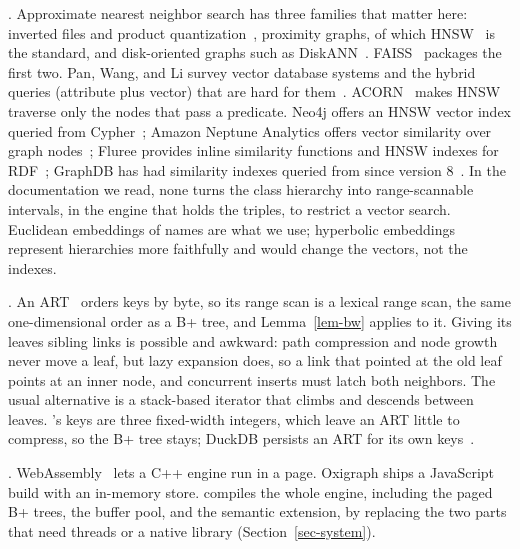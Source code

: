 .
Approximate nearest neighbor search has three families that matter here:
inverted files and product quantization~\cite{jegou2011}, proximity graphs, of
which HNSW~\cite{malkov2020} is the standard, and disk-oriented graphs such as
DiskANN~\cite{subramanya2019}.
FAISS~\cite{johnson2021} packages the first two.
Pan, Wang, and Li survey vector database systems and the hybrid queries
(attribute plus vector) that are hard for them~\cite{pan2024}.
ACORN~\cite{patel2024} makes HNSW traverse only the nodes that pass a
predicate.
Neo4j offers an HNSW vector index queried from Cypher~\cite{neo4jvec}; Amazon
Neptune Analytics offers vector similarity over graph nodes~\cite{neptunevec};
Fluree provides inline similarity functions and HNSW indexes for
RDF~\cite{fluree}; GraphDB has had similarity indexes queried from \sparql
since version 8~\cite{graphdbsim}.
In the documentation we read, none turns the class hierarchy into
range-scannable intervals, in the engine that holds the triples, to restrict
a vector search.
Euclidean embeddings of names are what we use; hyperbolic
embeddings~\cite{nickel2017} represent hierarchies more faithfully and would
change the vectors, not the indexes.

.
An ART~\cite{leis2013} orders keys by byte, so its range scan is a lexical
range scan, the same one-dimensional order as a B+ tree, and
Lemma~\ref{lem-bw} applies to it.
Giving its leaves sibling links is possible and awkward: path compression and
node growth never move a leaf, but lazy expansion does, so a link that
pointed at the old leaf points at an inner node, and concurrent inserts must
latch both neighbors.
The usual alternative is a stack-based iterator that climbs and descends
between leaves.
\sys's keys are three fixed-width integers, which leave an ART little to
compress, so the B+ tree stays; DuckDB persists an ART for its own
keys~\cite{duckdbart}.

.
WebAssembly~\cite{haas2017} lets a C++ engine run in a page.
Oxigraph ships a JavaScript build with an in-memory store.
\sys compiles the whole engine, including the paged B+ trees, the buffer pool,
and the semantic extension, by replacing the two parts that need threads or a
native library (Section~\ref{sec-system}).
